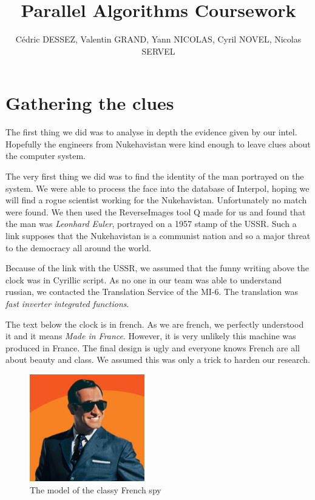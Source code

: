 \documentclass[11pt,a4paper]{article}
\begin{document}
\title{Parallel Algorithms Coursework}
\author{C\'edric DESSEZ, Valentin GRAND, Yann NICOLAS, Cyril NOVEL, Nicolas SERVEL}
\maketitle

\section{Gathering the clues}
The first thing we did was to analyse in depth the evidence given by our intel. Hopefully the engineers from Nukehavistan were kind enough to leave clues about the computer system.

The very first thing we did was to find the identity of the man portrayed on the system. We were able to process the face into the database of Interpol, hoping we will find a rogue scientist working for the Nukehavistan. Unfortunately no match were found. We then used the ReverseImages tool Q made for us and found that the man was \textit{Leonhard Euler}, portrayed on a 1957 stamp of the USSR. Such a link supposes that the Nukehavistan is a communist nation and so a major threat to the democracy all around the world.

Because of the link with the USSR, we assumed that the funny writing above the clock was in Cyrillic script. As no one in our team was able to understand russian, we contacted the Translation Service of the MI-6. The translation was \textit{fast inverter integrated functions}.

The text below the clock is in french. As we are french, we perfectly understood it and it means \textit{Made in France}. However, it is very unlikely this machine was produced in France. The final design is ugly and everyone knows French are all about beauty and class. We assumed this was only a trick to harden our research.

\begin{figure}[!h]
\centering
\includegraphics[width=5cm]{oss.png}
\caption{The model of the classy French spy}
\label{frenchspy}
\end{figure}
\end{document}
